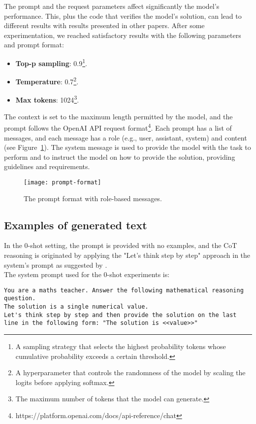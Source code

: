 The prompt and the request parameters affect significantly the model's performance.
This, plus the code that verifies the model's solution, can lead to different results with results presented in other papers.
After some experimentation, we reached satisfactory results with the following parameters and prompt format:
\begin{itemize}
	\item \textbf{Top-p sampling}: 0.9\footnote{A sampling strategy that selects the highest probability tokens whose cumulative probability exceeds a certain threshold.}.
	\item \textbf{Temperature}: 0.7\footnote{A hyperparameter that controls the randomness of the model by scaling the logits before applying softmax.}.
	\item \textbf{Max tokens}: 1024\footnote{The maximum number of tokens that the model can generate.}.
\end{itemize}
The context is set to the maximum length permitted by the model, and the prompt follows the OpenAI API request format\footnote{https://platform.openai.com/docs/api-reference/chat}.
Each prompt has a list of messages, and each message has a role (e.g., user, assistant, system) and content (see Figure~\ref{fig:prompt-format}).
The system message is used to provide the model with the task to perform and to instruct the model on how to provide the solution, providing guidelines and requirements.

\begin{figure}[h!]
	\centering
	\texttt{[image: prompt-format]}
	\caption{The prompt format with role-based messages.}
	\label{fig:prompt-format}
\end{figure}

\subsection{Examples of generated text}
\label{subsec:examples-of-generated-text}

In the 0-shot setting, the prompt is provided with no examples, and the CoT reasoning is originated by applying the "Let's think step by step" approach in the system's prompt as suggested by \textcite{kojima2023large}.\\

The system prompt used for the 0-shot experiments is:
\begin{Verbatim}[fontsize=\small,breaklines]
You are a maths teacher. Answer the following mathematical reasoning question.
The solution is a single numerical value.
Let's think step by step and then provide the solution on the last line in the following form: "The solution is <<value>>"
\end{Verbatim}

